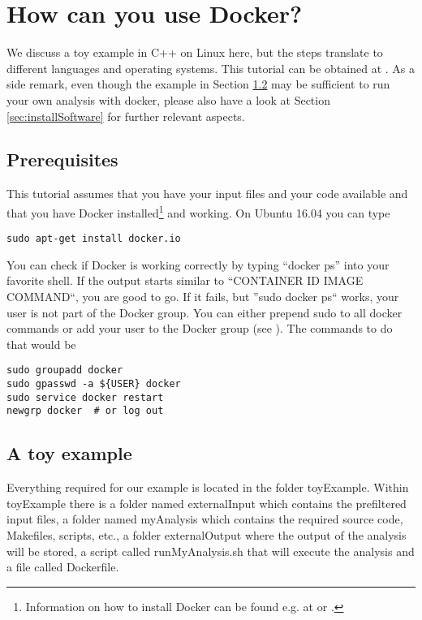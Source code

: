 \documentclass[a4paper, twoside, 11pt]{article}
\begin{document}
\section{How can you use Docker?}

We discuss a toy example in C++ on Linux here, 
but the steps translate to different languages and operating systems. 
This tutorial can be obtained at \cite{gith:tutorial}. 
As a side remark, even though the example in Section \ref{sec:toyexample} 
may be sufficient to run your own analysis with docker, 
please also have a look at Section \ref{sec:installSoftware}  
for further relevant aspects.

\subsection{Prerequisites}
\label{sec:isDockerRunning}

This tutorial assumes that you have your input files and your code available and that you have Docker 
installed\footnote{Information on how to install Docker can be found e.g. at 
\cite{digoc:install}
or \cite{dock:install}
.} and working. 
On Ubuntu 16.04 you can type 
\begin{lstlisting}[basicstyle=\ttfamily\small,upquote=true,columns=flexible,keepspaces=true,frame=single]
sudo apt-get install docker.io
\end{lstlisting}
\bigskip

You can check if Docker is working correctly by typing ``docker ps'' into your favorite shell. 
If the output starts similar to ``CONTAINER ID \hspace{0.5cm} IMAGE \hspace{0.5cm} COMMAND``, you are good to go. 
If it fails, but ''sudo docker ps`` works, your user is not part of the Docker group. 
You can either prepend sudo to all docker commands or add your user to the Docker group (see \cite{digoc:install}). 
The commands to do that would be 
\begin{lstlisting}[basicstyle=\ttfamily\small,upquote=true,columns=flexible,keepspaces=true,frame=single]
sudo groupadd docker
sudo gpasswd -a ${USER} docker
sudo service docker restart
newgrp docker  # or log out
\end{lstlisting}

\subsection{A toy example}
\label{sec:toyexample}
Everything required for our example is located in the folder toyExample. 
Within toyExample there is a folder named externalInput which contains the prefiltered input files, 
a folder named myAnalysis which contains the required source code, Makefiles, scripts, etc., 
a folder externalOutput where the output of the analysis will be stored, 
a script called runMyAnalysis.sh that will execute the analysis and a file called Dockerfile. 
\end{document}

